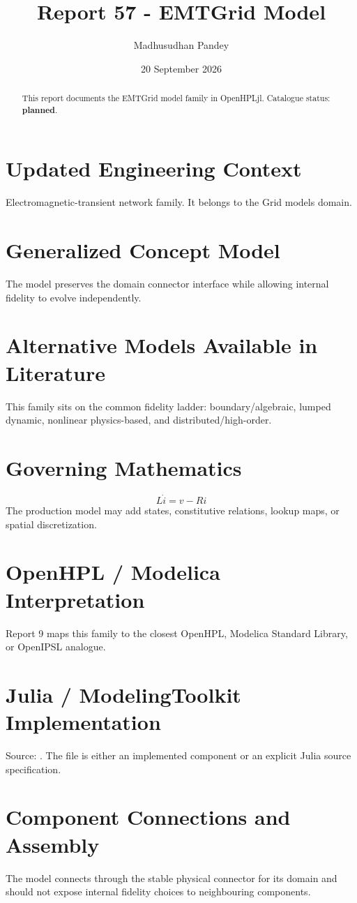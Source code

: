 \documentclass[10pt,a4paper]{article}
\title{Report 57 - EMTGrid Model}
\author{Madhusudhan Pandey}
\date{20 September 2026}
\begin{document}
\maketitle
\begin{abstract}This report documents the EMTGrid model family in OpenHPLjl. Catalogue status: \textbf{planned}.\end{abstract}
\section{Updated Engineering Context}Electromagnetic-transient network family. It belongs to the Grid models domain.
\section{Generalized Concept Model}The model preserves the domain connector interface while allowing internal fidelity to evolve independently.
\section{Alternative Models Available in Literature}This family sits on the common fidelity ladder: boundary/algebraic, lumped dynamic, nonlinear physics-based, and distributed/high-order.
\section{Governing Mathematics}\[L\dot i=v-Ri\]The production model may add states, constitutive relations, lookup maps, or spatial discretization.
\section{OpenHPL / Modelica Interpretation}Report 9 maps this family to the closest OpenHPL, Modelica Standard Library, or OpenIPSL analogue.
\section{Julia / ModelingToolkit Implementation}Source: \texttt{}. The file is either an implemented component or an explicit Julia source specification.
\section{Component Connections and Assembly}The model connects through the stable physical connector for its domain and should not expose internal fidelity choices to neighbouring components.
\end{document}
